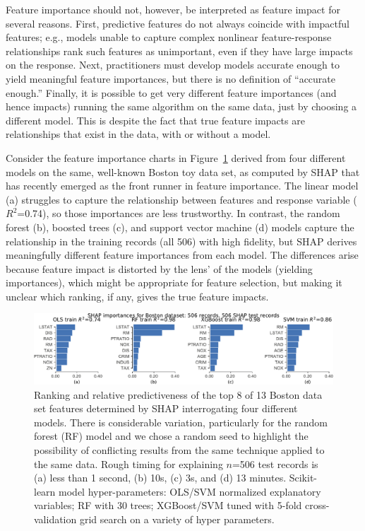 \documentclass[11pt]{article}
\newcommand{\figref}[1]{Figure~\ref{#1}}
\newcommand{\todo}[1]{{{\small\color{red}{[#1]}}}}
\begin{document}
Feature importance should not, however, be interpreted as feature impact for several reasons. First, predictive features do not always coincide with impactful features; e.g., models unable to capture complex nonlinear feature-response relationships rank such features as unimportant, even if they have large impacts on the response. Next, practitioners must develop models accurate enough to yield meaningful feature importances, but there is no definition of ``accurate enough.'' Finally, it is possible to get very different feature importances (and hence impacts) running the same algorithm on the same data, just by choosing a different model. This is despite the fact that true feature impacts are relationships that exist in the data, with or without a model.

Consider the feature importance charts in \figref{fig:diff-models} derived from four different models on the same, well-known Boston toy data set, as computed by SHAP that has recently emerged as the front runner in feature importance. The linear model (a) struggles to capture the relationship between features and response variable ($R^2$=0.74), so those importances are less trustworthy.  In contrast, the random forest (b), boosted trees (c), and support vector machine (d) models capture the relationship in the training records (all 506) with high fidelity, but SHAP derives meaningfully different feature importances from each model. The differences arise because feature impact is distorted by the lens' of the models (yielding importances), which might be appropriate for feature selection, but making it unclear which ranking, if any, gives the true feature impacts. 

\begin{figure}[htbp]
\begin{center}
\includegraphics[scale=0.6]{images/diff-models.pdf}
\caption{\small Ranking and relative predictiveness of the top 8 of 13 Boston data set features determined by SHAP interrogating four different models.  There is considerable variation, particularly for the random forest (RF) model and we chose a random seed to highlight the possibility of conflicting results from the same technique applied to the same data. Rough timing for explaining $n$=506 test records is (a) less than 1 second, (b) 10s, (c) 3s, and (d) 13 minutes.  Scikit-learn model hyper-parameters: OLS/SVM normalized explanatory variables; RF with 30 trees; XGBoost/SVM tuned with 5-fold cross-validation grid search on a variety of hyper parameters. \todo{SHAP time for 506 test records using SVR = 753.6s, 506/506 [12:33<00:00,  1.49s/it]. training score only since very small, gives idea of capture relationship. shap explains entire training set for full resolution.}}
\label{fig:diff-models}
\end{center}
\end{figure}
\end{document}
